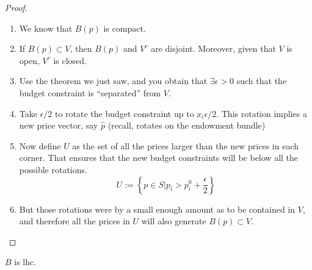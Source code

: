 \documentclass[aspectratio=169, handout]{beamer}
\begin{document}
\begin{frame}
    \begin{proof}
        \begin{enumerate}
            \item We know that $B(p)$ is compact.
            \item If $B(p)\subset V$, then $B(p)$ and $V^c$ are disjoint. Moreover, given that $V$ is open, $V^c$ is closed.
            \item Use the theorem we just saw, and you obtain that $\exists \epsilon > 0$ such that the budget constraint is ``separated'' from $V$.
            \item Take $\epsilon/2$ to rotate the budget constraint up to $x_i\epsilon/2$. This rotation implies a new price vector, say $\hat{p}$ (recall, rotates on the endowment bundle)
            \item Now define $U$ as the set of all the prices larger than the new prices in each corner. That ensures that the new budget constraints will be below all the possible rotations.\[U:=\left\{p\in S| p_i>p_i^0+\frac{\epsilon}{2}\right\}\]
            \item But those rotations were by a small enough amount as to be contained in $V$, and therefore all the prices in $U$ will also generate $B(p)\subset V$.
        \end{enumerate}
    \end{proof}
\end{frame}

\begin{frame}
    \begin{figure}
    \end{figure}
\end{frame}

\begin{frame}
    \begin{theorem}
        $B$ is lhc.
    \end{theorem}
\end{frame}
\end{document}
